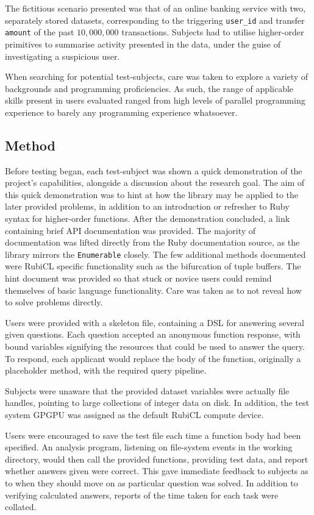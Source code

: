The fictitious scenario presented was that of an online banking service with two, separately stored datasets, corresponding to the triggering \verb|user_id| and transfer \verb|amount| of the past $10,000,000$ transactions. Subjects had to utilise higher-order primitives to summarise activity presented in the data, under the guise of investigating a suspicious user.

When searching for potential test-subjects, care was taken to explore a variety of backgrounds and programming proficiencies.
As such, the range of applicable skills present in users evaluated ranged from high levels of parallel programming experience to barely any programming experience whatsoever.

\subsection{Method}
Before testing began, each test-subject was shown a quick demonstration of the project's capabilities, alongside a discussion about the research goal.
The aim of this quick demonstration was to hint at how the library may be applied to the later provided problems, in addition to an introduction or refresher to Ruby syntax for higher-order functions. After the demonstration concluded, a link\cite{user_test_hints} containing brief \ac{API} documentation was provided. The majority of documentation was lifted directly from the Ruby documentation source, as the library mirrors the \verb|Enumerable| closely. The few additional methods documented were RubiCL specific functionality such as the bifurcation of tuple buffers. The hint document was provided so that stuck or novice users could remind themselves of basic language functionality. Care was taken as to not reveal how to solve problems directly.

Users were provided with a skeleton file, containing a DSL for answering several given questions. Each question accepted an anonymous function response, with bound variables signifying the resources that could be used to answer the query. To respond, each applicant would replace the body of the function, originally a placeholder method, with the required query pipeline.

Subjects were unaware that the provided dataset variables were actually file handles, pointing to large collections of integer data on disk. In addition, the test system \ac{GPGPU} was assigned as the default RubiCL compute device.

Users were encouraged to save the test file each time a function body had been specified. An analysis program, listening on file-system events in the working directory, would then call the provided functions, providing test data, and report whether answers given were correct. This gave immediate feedback to subjects as to when they should move on as particular question was solved. In addition to verifying calculated answers, reports of the time taken for each task were collated.

